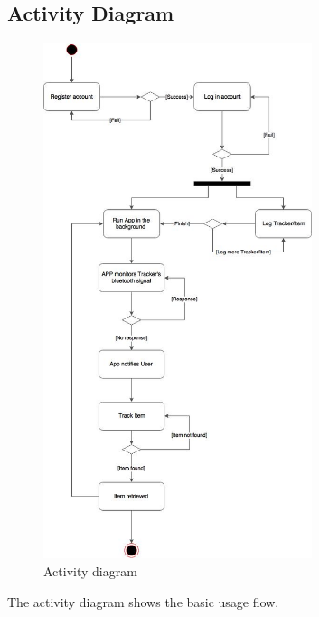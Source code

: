 \documentclass[12pt,a4paper]{article}
\begin{document}
        \subsection{Activity Diagram}
          \begin{figure}[H]
            \centering
            \includegraphics[width=0.7\textwidth]{../assets/5-activity-diagram.jpg}
            \caption{Activity diagram}
            \label{fig:Activity diagram}
          \end{figure}
          The activity diagram shows the basic usage flow.
\end{document}
